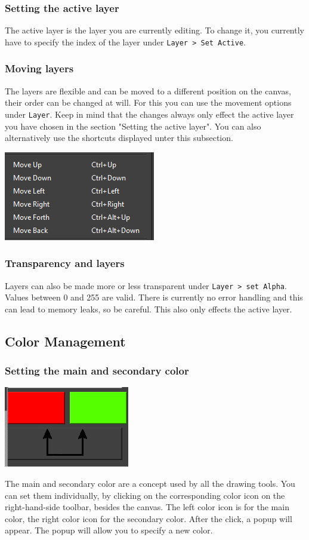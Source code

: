 \documentclass[a4paper, 12pt]{article}
\begin{document}
\subsubsection{Setting the active layer}
The active layer is the layer you are currently editing. To change it, you currently have to specify the index of the layer under \texttt{Layer > Set Active}.

\subsubsection{Moving layers}
The layers are flexible and can be moved to a different position on the canvas, their order can be changed at will. For this you can use the movement options under \texttt{Layer}. Keep in mind that the changes always only effect the active layer you have chosen in the section "Setting the active layer". You can also alternatively use the shortcuts displayed unter this subsection.

\begin{center}
\includegraphics[width=0.3\linewidth,keepaspectratio]{assets/layer-options}
\end{center}

\subsubsection{Transparency and layers}
Layers can also be made more or less transparent under \texttt{Layer > set Alpha}. Values between 0 and 255 are valid. There is currently no error handling and this can lead to memory leaks, so be careful. This also only effects the active layer.

\subsection{Color Management}
\subsubsection{Setting the main and secondary color}
\begin{center}
\includegraphics[width=0.3\linewidth,keepaspectratio]{assets/change-colors}
\end{center}
The main and secondary color are a concept used by all the drawing tools. You can set them individually, by clicking on the corresponding color icon on the right-hand-side toolbar, besides the canvas. The left color icon is for the main color, the right color icon for the secondary color.
After the click, a popup will appear. The popup will allow you to specify a new color.
\end{document}
